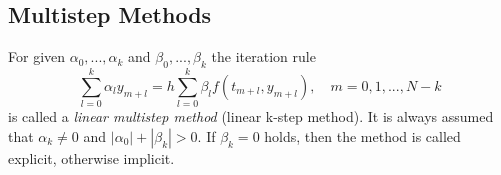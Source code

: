 	
	\subsection{Multistep Methods}
	\begin{frame}
		\begin{definition}
			\label{def:multi step method}
			For given $\alpha_0, ..., \alpha_k$ and $\beta_0, ..., \beta_k$ the iteration rule
			\begin{equation}
				\label{linear-multistep-method}
				\sum_{l=0}^{k} \alpha_l y_{m+l} = h \sum_{l=0}^{k} \beta_l f(t_{m+l}, y_{m+l}), \quad m=0,1,...,N-k
			\end{equation}
			is called a \emph{linear multistep method} (linear k-step method). It is always assumed that $\alpha_k \neq 0$ and $|\alpha_0| + |\beta_k| > 0$. If $\beta_k=0$ holds, then the method is called explicit, otherwise implicit.
		\end{definition}
	\end{frame}
	

